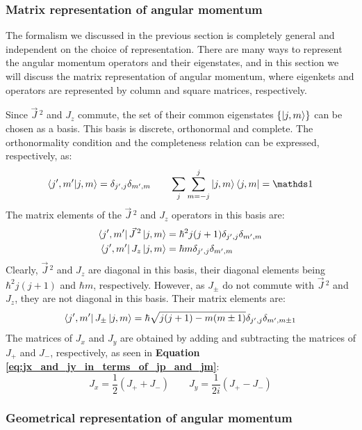 \subsubsection{Matrix representation of angular momentum}

The formalism we discussed in the previous section is completely general and independent on the choice of representation. There are many ways to represent the angular momentum operators and their eigenstates, and in this section we will discuss the matrix representation of angular momentum, where eigenkets and operators are represented by column and square matrices, respectively.

Since $\vec{J}\,^2$ and $J_z$ commute, the set of their common eigenstates $\{\ket{j, m}\}$ can be chosen as a basis. This basis is discrete, orthonormal and complete. The orthonormality condition and the completeness relation can be expressed, respectively, as:
\begin{equation}
    \braket{j',m'|j,m} = \delta_{j',j}\delta_{m',m} \qquad\sum_{j}\sum_{m=-j}^{j}\ket{j,m}\bra{j,m} = \Imat
\end{equation}
The matrix elements of the $\vec{J}\,^2$ and $J_z$ operators in this basis are:
\begin{equation}
    \begin{split}
        \bra{j',m'}\vec{J}\,^2\ket{j,m} &= \hbar^2j(j+1)\delta_{j',j}\delta_{m',m} \\
        \bra{j',m'}J_z\ket{j,m} &= \hbar m\delta_{j',j}\delta_{m',m}
    \end{split}
\end{equation}
Clearly, $\vec{J}\,^2$ and $J_z$ are diagonal in this basis, their diagonal elements being $\hbar^2j(j+1)$ and $\hbar m$, respectively. However, as $J_\pm$ do not commute with $\vec{J}\,^2$ and $J_z$, they are not diagonal in this basis. Their matrix elements are:
\begin{equation}
    \bra{j',m'}J_\pm\ket{j,m} = \hbar \sqrt{j(j+1)-m(m\pm 1)}\delta_{j',j}\delta_{m',m\pm 1} \\
\end{equation}
The matrices of $J_x$ and $J_y$ are obtained by adding and subtracting the matrices of $J_+$ and $J_-$, respectively, as seen in \textbf{Equation \ref{eq:jx_and_jy_in_terms_of_jp_and_jm}}:
\begin{equation}
    J_x = \frac12(J_+ + J_-)\qquad J_y = \frac{1}{2i}(J_+ - J_-)
\end{equation}

\subsubsection{Geometrical representation of angular momentum}

